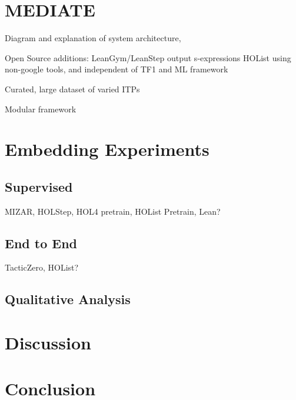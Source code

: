 \documentclass[letterpaper]{article} %
\begin{document}
    \section{MEDIATE}
    Diagram and explanation of system architecture,

    Open Source additions:
    LeanGym/LeanStep output s-expressions
    HOList using non-google tools, and independent of TF1 and ML framework

    Curated, large dataset of varied ITPs

    Modular framework


    \section{Embedding Experiments}

    \subsection{Supervised}
    MIZAR, HOLStep, HOL4 pretrain, HOList Pretrain, Lean?

    \subsection{End to End}
    TacticZero, HOList?

    \subsection{Qualitative Analysis}


    \section{Discussion}


    \section{Conclusion}
\end{document}
